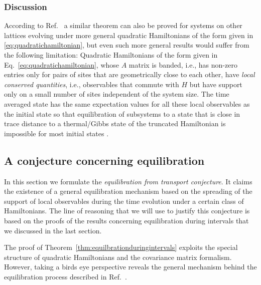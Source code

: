 \documentclass[a4paper,12pt,listof=totoc,index=totoc,bibliography=totoc,headsepline=false,headings=normal,BCOR16.153846mm,DIV12,headinclude,twoside,cleardoublepage=empty,numbers=noenddot,final]{scrreprt}
\theoremstyle{mystyle}
\numberwithin{equation}{section}
\numberwithin{figure}{section}
\numberwithin{lemma}{section}
\numberwithin{theorem}{section}
\numberwithin{corollary}{section}
\numberwithin{definition}{section}
\numberwithin{conjecture}{section}
\numberwithin{observation}{section}
\newcommand{\+}{\mkern2mu}
\newcommand{\texteqref}[1]{Eq.~\eqref{#1}}
\renewcommand{\H}{H}
\DeclareMathOperator{\1}{\mathds{1}}
\begin{document}
\subsubsection*{Discussion}
%
According to Ref.~\cite{cramer10_1} a similar theorem can also be proved for systems on other lattices evolving under more general quadratic Hamiltonians of the form given in \eqref{eq:quadratichamiltonian}, but even such more general results would suffer from the following limitation: 
Quadratic Hamiltonians of the form given in \texteqref{eq:quadratichamiltonian}, whose $A$ matrix is banded, i.e., has non-zero entries only for pairs of sites that are geometrically close to each other, have \emph{local conserved quantities}, i.e., observables that commute with $\H$ but have support only on a small number of sites independent of the system size.
The time averaged state has the same expectation values for all these local observables as the initial state so that equilibration of subsystems to a state that is close in trace distance to a thermal/Gibbs state of the truncated Hamiltonian is impossible for most initial states \cite{Lanford1972,cramer10_1}.


\subsection{A conjecture concerning equilibration}
\label{sec:conjectureconcerningequilibration}
%
In this section we formulate the \emph{equilibration from transport conjecture}.
It claims the existence of a general equilibration mechanism based on the spreading of the support of local observables during the time evolution under a certain class of Hamiltonians.
The line of reasoning that we will use to justify this conjecture is based on the proofs of the results concerning equilibration during intervals that we discussed in the last section.

The proof of Theorem~\ref{thm:equilbrationduringintervals} exploits the special structure of quadratic Hamiltonians and the covariance matrix formalism.
However, taking a birds eye perspective reveals the general mechanism behind the equilibration process described in Ref.~\cite{cramer10_1}.
\end{document}
